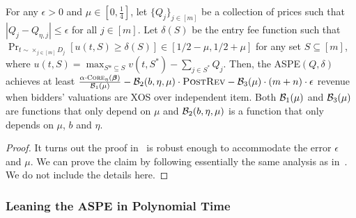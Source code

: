 \begin{lemma}\label{lem:symmetric approx ASPE}
	For any $\epsilon>0$ and $\mu\in[0,\frac{1}{4}]$, let $\{Q_j\}_{j\in[m]}$ be a collection of prices such that $\left|Q_j-Q_{\eta,j}\right|\leq \epsilon$ for all $j\in[m]$. Let $\delta(S)$ be the entry fee function such that $\Pr_{t\sim \times_{j\in[m]} D_j}\left [u(t,S)\geq \delta(S)\right]\in [1/2-\mu,1/2+\mu]$ for any set $S\subseteq [m]$, where $u(t,S) = \max_{S*\subseteq S} v(t,S^*)-\sum_{j\in S^*} Q_j$. Then, the ASPE$(Q,\delta)$ achieves at least $\frac{\alpha\cdot\textsc{Core}_{\eta}(\boldsymbol{\beta})}{{\cal B}_{1}(\mu)}-{\cal B}_{2}(b,\eta,\mu)\cdot \textsc{PostRev}-{\cal B}_3(\mu)\cdot (m+n)\cdot \epsilon$ revenue when bidders' valuations are XOS over independent item. Both ${\cal B}_1(\mu)$ and ${\cal B}_{3}(\mu)$ are functions that only depend on $\mu$ and ${\cal B}_{2}(b,\eta,\mu)$ is a function that only depends on $\mu$, $b$ and $\eta$. 
\end{lemma}
\begin{proof}
It turns out the proof in~\cite{CaiZ17} is robust enough to accommodate the error $\epsilon$ and $\mu$. We can prove the claim by following essentially the same analysis as in~\cite{CaiZ17}. We do not include the details here.\end{proof}
	
\subsubsection{Leaning the ASPE in Polynomial Time}

